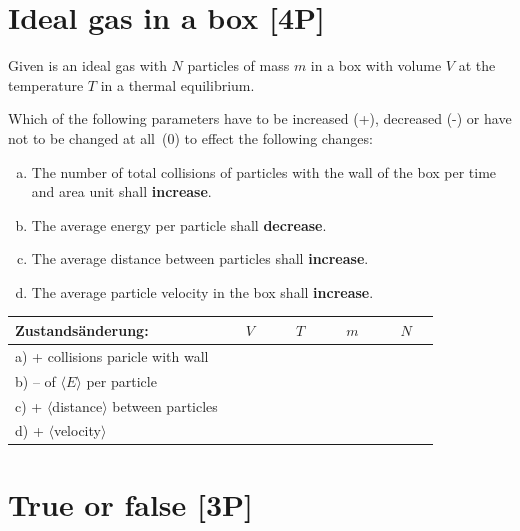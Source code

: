 \documentclass[12pt,a4paper]{article} %
\begin{document}
\section{Ideal gas in a box [4P]}
Given is an ideal gas with $N$ particles of mass $m$ in a box with volume $V$ at the temperature $T$ in a thermal equilibrium.


Which of the following parameters have to be increased (+), decreased (-) or have not to be changed at all~(0) to effect the following changes:
\begin{enumerate}[a)]
 \item The number of total collisions of particles with the wall of the box per time and area unit shall \textbf{increase}.
 \item The average energy per particle shall {\bf decrease}.
 \item The average distance between particles shall {\bf increase}.
 \item The average particle velocity in the box shall {\bf increase}.
\end{enumerate}


\begin{table}[h]
\begin{center}
 \begin{tabular}{|l| c|c|c|c|}
 \hline 
  Zustandsänderung: & $\quad V \quad$ & $\quad T \quad $ & $\quad m \quad$ & $\quad N \quad$ \\
  \hline \hline
  a) + collisions paricle with wall & &&& \\ \hline
  b) -- of $\langle E \rangle$ per particle & &&& \\ \hline
  c) + $\langle$distance$\rangle$ between particles & &&& \\ \hline
  d) + $\langle$velocity$\rangle$ & &&& \\ \hline
 \end{tabular}
\end{center}
\end{table}
 
\section{True or false [3P]}
\end{document}
